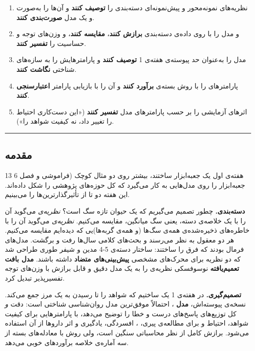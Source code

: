 \begin{enumerate}
\def\labelenumi{\arabic{enumi}.}
\tightlist
\item
  نظریه‌های نمونه‌محور  و پیش‌نمونه‌ای 
  دسته‌بندی را \textbf{توصیف کنند} و آن‌ها را به‌صورت  و یک مدل
   \textbf{صورت‌بندی کنند}.
\item
   و مدل  را با  روی داده‌ی دسته‌بندی
  \textbf{برازش کنند}، \textbf{مقایسه کنند}، و وزن‌های توجه و حساسیت را
  \textbf{تفسیر کنند}.
\item
  مدل  را به‌عنوان حد پیوسته‌ی 
  هفته‌ی 1 \textbf{توصیف کنند} و پارامترهایش را به سازه‌های شناختی
  \textbf{نگاشت کنند}.
\item
  پارامترهای  را با روش بسته‌ی 
  \textbf{برآورد کنند} و آن را با بازیابی پارامتر \textbf{اعتبارسنجی
  کنند}.
\item
  اثرهای آزمایشی را بر حسب پارامترهای مدل \textbf{تفسیر کنند} («این
  دست‌کاری احتیاط را تغییر داد، نه کیفیت شواهد را»).
\end{enumerate}

\begin{center}\rule{0.5\linewidth}{0.5pt}\end{center}

\subsection{مقدمه}

13 هفته‌ی اول یک جعبه‌ابزار ساختند، بیشتر روی دو مثال کوچک (فراموشی و
 فصل 6 جعبه‌ابزار را روی مدل‌هایی به کار می‌گیرد که کل حوزه‌های
پژوهشی را شکل داده‌اند. این هفته دو تا از تأثیرگذارترین‌ها را می‌بینیم.

\textbf{دسته‌بندی.} چطور تصمیم می‌گیریم که یک حیوان تازه سگ است؟
\emph{نظریه‌ی } می‌گوید آن را با یک خلاصه‌ی دسته، یعنی سگ
میانگین، مقایسه می‌کنیم. \emph{نظریه‌ی } می‌گوید آن را با
خاطره‌های ذخیره‌شده‌ی همه‌ی سگ‌ها (و همه‌ی گربه‌ها)یی که دیده‌ایم مقایسه می‌کنیم.
هر دو معقول به نظر می‌رسند و بحث‌های کلامی سال‌ها رفت و برگشت. مدل‌های فرمال
بودند که فرق را ساختند: ساختار دسته‌ی 5-4 مدین و شیفر طوری طراحی شد که دو
نظریه برای محرک‌های مشخصی \textbf{پیش‌بینی‌های متضاد} داشته باشند.
\textbf{مدل بافت تعمیم‌یافته } نوسوفسکی نظریه‌ی  را
به یک مدل دقیق و قابل برازش با وزن‌های توجه تفسیرپذیر تبدیل کرد.

\textbf{تصمیم‌گیری.} در هفته‌ی 1 یک  ساختیم که شواهد را تا
رسیدن به یک مرز جمع می‌کند. نسخه‌ی پیوسته‌اش، \textbf{مدل
}، احتمالاً موفق‌ترین مدل روان‌شناسی شناختی است: دقت
\emph{و} کل توزیع‌های  پاسخ‌های درست و خطا را توضیح می‌دهد، با
پارامترهایی برای کیفیت شواهد، احتیاط و  برای
مطالعه‌ی پیری، ، افسردگی، یادگیری و اثر داروها از آن استفاده
می‌شود. برازش  کامل از نظر محاسباتی سنگین است، ولی روش
\textbf{} با معادله‌های بسته از سه آماره‌ی خلاصه
برآوردهای خوبی می‌دهد.

